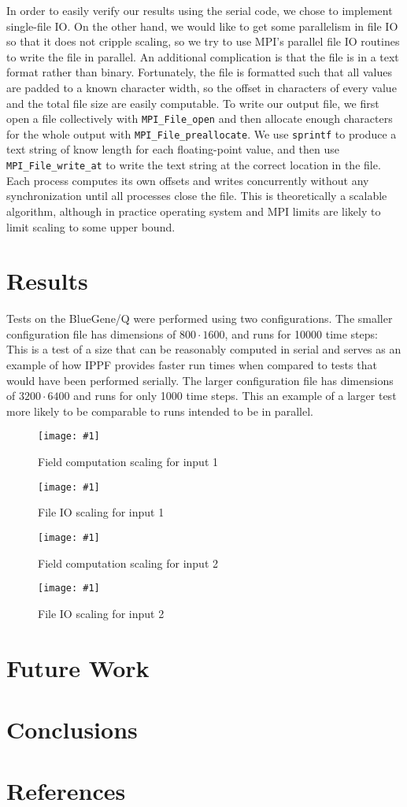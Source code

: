 \documentclass[twocolumn]{article}
\newcommand{\myimage}[3]{
\begin{figure}[!ht]
\caption{#2}
\label{#3}
\texttt{[image: \#1]}
\end{figure}
}
\begin{document}
In order to easily verify our results using the serial code,
we chose to implement single-file IO.
On the other hand, we would like to get some parallelism in
file IO so that it does not cripple scaling, so we try to use
MPI's parallel file IO routines to write the file in parallel.
An additional complication is that the file is in a text format
rather than binary.
Fortunately, the file is formatted such that all values are
padded to a known character width, so the offset in characters
of every value and the total file size are easily computable.
To write our output file, we first open a file collectively
with \texttt{MPI\_File\_open} and then 
allocate enough characters for the whole output with
\texttt{MPI\_File\_preallocate}.
We use
\texttt{sprintf} to produce a text string of know length for
each floating-point value, and then use
\texttt{MPI\_File\_write\_at} to write the text string at
the correct location in the file.
Each process computes its own offsets and writes concurrently
without any synchronization until all processes close the file.
This is theoretically a scalable algorithm, although in practice
operating system and MPI limits are likely to limit scaling
to some upper bound.

\section{Results}

Tests on the BlueGene/Q were performed using two configurations.
The smaller configuration file has dimensions of $800 \cdot 1600$,
and runs for 10000 time steps:\\

This is a test of a size that can be reasonably computed in serial
and serves as an example of how IPPF provides faster run times when
compared to tests that would have been performed serially.
The larger configuration file has dimensions of $3200 \cdot 6400$
and runs for only 1000 time steps. This an example of a larger
test more likely to be comparable to runs intended to be in parallel.


\myimage{one_calc.png}{Field computation scaling for input 1}{fig:calc1}
\myimage{one_file.png}{File IO scaling for input 1}{fig:file1}
\myimage{two_calc.png}{Field computation scaling for input 2}{fig:calc2}
\myimage{two_file.png}{File IO scaling for input 2}{fig:file2}

\section{Future Work}

\section{Conclusions}

\section{References}
\end{document}
